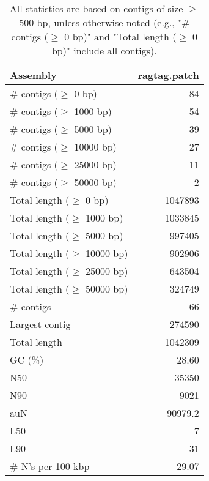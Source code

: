 \documentclass[12pt,a4paper]{article}
\begin{document}
\begin{table}[ht]
\begin{center}
\caption{All statistics are based on contigs of size $\geq$ 500 bp, unless otherwise noted (e.g., "\# contigs ($\geq$ 0 bp)" and "Total length ($\geq$ 0 bp)" include all contigs).}
\begin{tabular}{|l*{1}{|r}|}
\hline
Assembly & ragtag.patch \\ \hline
\# contigs ($\geq$ 0 bp) & 84 \\ \hline
\# contigs ($\geq$ 1000 bp) & 54 \\ \hline
\# contigs ($\geq$ 5000 bp) & 39 \\ \hline
\# contigs ($\geq$ 10000 bp) & 27 \\ \hline
\# contigs ($\geq$ 25000 bp) & 11 \\ \hline
\# contigs ($\geq$ 50000 bp) & 2 \\ \hline
Total length ($\geq$ 0 bp) & 1047893 \\ \hline
Total length ($\geq$ 1000 bp) & 1033845 \\ \hline
Total length ($\geq$ 5000 bp) & 997405 \\ \hline
Total length ($\geq$ 10000 bp) & 902906 \\ \hline
Total length ($\geq$ 25000 bp) & 643504 \\ \hline
Total length ($\geq$ 50000 bp) & 324749 \\ \hline
\# contigs & 66 \\ \hline
Largest contig & 274590 \\ \hline
Total length & 1042309 \\ \hline
GC (\%) & 28.60 \\ \hline
N50 & 35350 \\ \hline
N90 & 9021 \\ \hline
auN & 90979.2 \\ \hline
L50 & 7 \\ \hline
L90 & 31 \\ \hline
\# N's per 100 kbp & 29.07 \\ \hline
\end{tabular}
\end{center}
\end{table}
\end{document}
